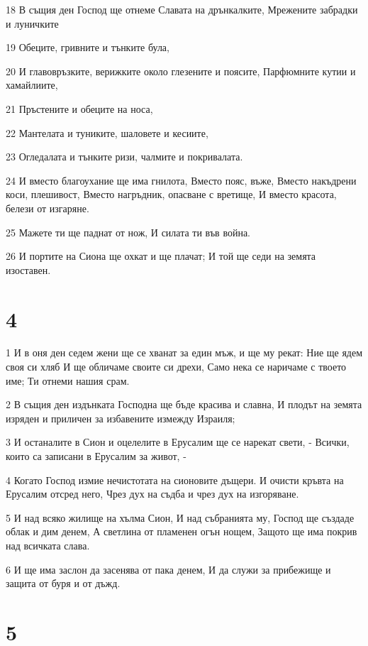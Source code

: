 \par 18 В същия ден Господ ще отнеме Славата на дрънкалките, Мрежените забрадки и луничките
\par 19 Обеците, гривните и тънките була,
\par 20 И главовръзките, верижките около глезените и поясите, Парфюмните кутии и хамайлиите,
\par 21 Пръстените и обеците на носа,
\par 22 Мантелата и туниките, шаловете и кесиите,
\par 23 Огледалата и тънките ризи, чалмите и покривалата.
\par 24 И вместо благоухание ще има гнилота, Вместо пояс, въже, Вместо накъдрени коси, плешивост, Вместо нагръдник, опасване с вретище, И вместо красота, белези от изгаряне.
\par 25 Мажете ти ще паднат от нож, И силата ти във война.
\par 26 И портите на Сиона ще охкат и ще плачат; И той ще седи на земята изоставен.

\chapter{4}

\par 1 И в оня ден седем жени ще се хванат за един мъж, и ще му рекат: Ние ще ядем своя си хляб И ще обличаме своите си дрехи, Само нека се наричаме с твоето име; Ти отнеми нашия срам.
\par 2 В същия ден издънката Господна ще бъде красива и славна, И плодът на земята изряден и приличен за избавените измежду Израиля;
\par 3 И останалите в Сион и оцелелите в Ерусалим ще се нарекат свети, - Всички, които са записани в Ерусалим за живот, -
\par 4 Когато Господ измие нечистотата на сионовите дъщери. И очисти кръвта на Ерусалим отсред него, Чрез дух на съдба и чрез дух на изгоряване.
\par 5 И над всяко жилище на хълма Сион, И над събранията му, Господ ще създаде облак и дим денем, А светлина от пламенен огън нощем, Защото ще има покрив над всичката слава.
\par 6 И ще има заслон да засенява от пака денем, И да служи за прибежище и защита от буря и от дъжд.

\chapter{5}

